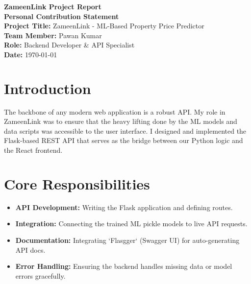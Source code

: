 \documentclass[12pt, a4paper]{article}
\begin{document}
\begin{titlepage}
    \centering
    \vspace*{2cm}
    {\Huge \textbf{ZameenLink Project Report}}\\[1.5cm]
    {\Large \textbf{Personal Contribution Statement}}\\[1cm]
    
    \textbf{Project Title:} ZameenLink - ML-Based Property Price Predictor\\
    \textbf{Team Member:} Pawan Kumar\\
    \textbf{Role:} Backend Developer \& API Specialist\\
    \textbf{Date:} \today\\[3cm]
    
    \begin{abstract}
        This detailed report highlights Pawan Kumar's contributions to the ZameenLink project. Key areas include the development of the Flask REST API, server-side logic, Swagger documentation integration, and frontend-backend connectivity.
    \end{abstract}
    
    \vfill
\end{titlepage}

\tableofcontents
\newpage

\section{Introduction}
The backbone of any modern web application is a robust API. My role in ZameenLink was to ensure that the heavy lifting done by the ML models and data scripts was accessible to the user interface. I designed and implemented the Flask-based REST API that serves as the bridge between our Python logic and the React frontend.

\section{Core Responsibilities}
\begin{itemize}
    \item \textbf{API Development:} Writing the Flask application and defining routes.
    \item \textbf{Integration:} Connecting the trained ML pickle models to live API requests.
    \item \textbf{Documentation:} Integrating `Flasgger` (Swagger UI) for auto-generating API docs.
    \item \textbf{Error Handling:} Ensuring the backend handles missing data or model errors gracefully.
\end{itemize}
\end{document}
